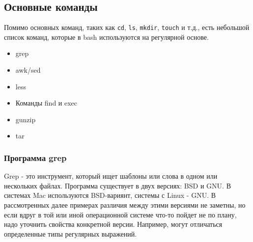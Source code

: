 \documentclass[12pt]{article}
\providecommand{\tightlist}{%
  \setlength{\itemsep}{0pt}\setlength{\parskip}{0pt}}
\begin{document}
\hypertarget{Common-Commands}{%
\subsection{\texorpdfstring{\protect\hyperlink{Common-Commands}{}Основные
команды}{Основные команды}}\label{Common-Commands}}

Помимо основных команд, таких как \texttt{cd}, \texttt{ls},
\texttt{mkdir}, \texttt{touch} и т.д., есть небольшой список команд,
которые в bash используются на регулярной основе.

\begin{itemize}
\tightlist
\item
  grep
\item
  awk/sed
\item
  less
\item
  Команды find и exec
\item
  gunzip
\item
  tar
\end{itemize}

\hypertarget{grep}{%
  \subsubsection{\texorpdfstring{\protect\hyperlink{grep}{}Программа grep}{Программа grep}}\label{grep}}

Grep - это инструмент, который ищет шаблоны или слова в одном или
нескольких файлах. Программа существует в двух версиях: BSD и GNU. В
системах Mac используются BSD-вариянт, системы с Linux - GNU. В
рассмотренных далее примерах различия между этими версиями не заметны,
но если вдруг в той или иной операционной системе что-то пойдет не по
плану, надо уточнить свойства конкретной версии. Например, могут
отличаться определенные типы регулярных выражений.
\end{document}
